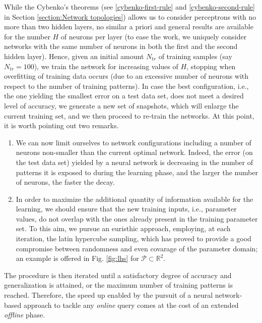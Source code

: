 \documentclass[12pt, a4paper, twoside, openright, notitlepage]{report}
\numberwithin{equation}{chapter}
\theoremstyle{theorem}
\theoremstyle{definition}
\theoremstyle{remark}
\theoremstyle{proposition}
\numberwithin{figure}{chapter}
\begin{document}
		While the Cybenko's theorems (see \ref{cybenko-first-rule} and \ref{cybenko-second-rule} in Section \ref{section:Network topologies}) allows us to consider perceptrons with no more than two hidden layers, no similar a priori and general results are available for the number $H$ of neurons per layer (to ease the work, we uniquely consider networks with the same number of neurons in both the first and the second hidden layer). Hence, given an initial amount $N_{tr}$ of training samples (say $N_{tr} = 100$), we train the network for increasing values of $H$, stopping when overfitting of training data occurs (due to an excessive number of neurons with respect to the number of training patterns). In case the best configuration, i.e., the one yielding the smallest error on a test data set, does not meet a desired level of accuracy, we generate a new set of snapshots, which will enlarge the current training set, and we then proceed to re-train the networks. At this point, it is worth pointing out two remarks. 
		\begin{enumerate}[label=(\roman*)]
			\vspace*{-0.1cm}
			\item We can now limit ourselves to network configurations including a number of neurons non-smaller than the current optimal network. Indeed, the error (on the test data set) yielded by a neural network is decreasing in the number of patterns it is exposed to during the learning phase, and the larger the number of neurons, the faster the decay.
			\vspace*{-0.7cm}
			\item In order to maximize the additional quantity of information available for the learning, we should ensure that the new training inputs, i.e., parameter values, do not overlap with the ones already present in the training parameter set. To this aim, we pursue an euristhic approach, employing, at each iteration, the latin hypercube sampling, which has proved to provide a good compromise between randomness and even covarage of the parameter domain; an example is offered in Fig. \ref{fig:lhs} for $\mathcal{P} \subset \mathbb{R}^2$.
		\end{enumerate} 
		\vspace*{-0.1cm}
		The procedure is then iterated until a satisfactory degree of accuracy and generalization is attained, or the maximum number of training patterns is reached. Therefore, the speed up enabled by the pursuit of a neural network-based approach to tackle any \emph{online} query comes at the cost of an extended \emph{offline} phase.
		
\end{document}
